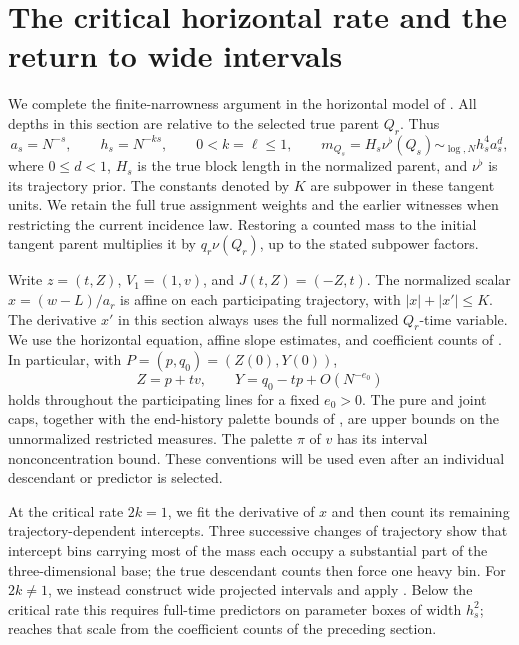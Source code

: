 \section{The critical horizontal rate and the return to wide intervals}
\label{sec:critical-rates}

We complete the finite-narrowness argument in the horizontal model of
.  All depths in this section are relative to
the selected true parent \(Q_r\).  Thus
\[
 a_s=N^{-s},\qquad h_s=N^{-ks},\qquad 0<k=\ell\le1,
 \qquad m_{Q_s}=H_s\nu^\flat(Q_s)
       \sim_{\log,N}h_s^4a_s^d,
\]
where \(0\le d<1\), \(H_s\) is the true block length in the normalized
parent, and \(\nu^\flat\) is its trajectory prior.  The constants denoted
by \(K\) are subpower in these tangent units.  We retain the full true
assignment weights and the earlier witnesses when restricting the current
incidence law.  Restoring a counted mass to the initial tangent parent
multiplies it by \(q_r\nu(Q_r)\), up to the stated subpower factors.

Write \(z=(t,Z)\), \(V_1=(1,v)\), and \(J(t,Z)=(-Z,t)\).  The
normalized scalar \(x=(w-L)/a_r\) is affine on each participating
trajectory, with \(|x|+|x'|\le K\).  The derivative \(x'\) in this section
always uses the full normalized \(Q_r\)-time variable.  We use the
horizontal equation, affine slope estimates, and coefficient counts of
.  In particular, with
\(P=(p,q_0)=(Z(0),Y(0))\),
\begin{equation}
 Z=p+tv,\qquad Y=q_0-tp+O(N^{-e_0})
 \label{a07:parameter-reconstruction}
\end{equation}
holds throughout the participating lines for a fixed \(e_0>0\).
The pure and joint caps, together with the end-history palette bounds of
, are upper bounds on the unnormalized
restricted measures.  The palette \(\pi\) of \(v\) has its interval
nonconcentration bound.  These conventions will be used even after an
individual descendant or predictor is selected.

At the critical rate \(2k=1\), we fit the derivative of \(x\)
and then count its remaining trajectory-dependent intercepts. Three
successive changes of trajectory show that intercept bins carrying
most of the mass each occupy a substantial part of the three-dimensional base; the true descendant
counts then force one heavy bin. For \(2k\ne1\), we instead construct
wide projected intervals and apply . Below
the critical rate this requires full-time predictors on parameter
boxes of width \(h_s^2\);  reaches that scale
from the coefficient counts of the preceding section.

